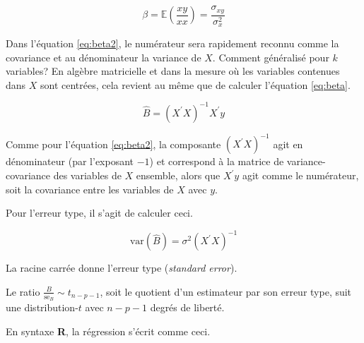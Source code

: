 \documentclass[
]{book}
\newcommand{\EX}{\mathbb{E}}
\begin{document}
\begin{equation}
\beta = \EX(\frac{xy}{xx}) = \frac{\sigma_{xy}}{\sigma^2_x}
\label{eq:beta2}
\end{equation}

Dans l'équation \eqref{eq:beta2}, le numérateur sera rapidement reconnu comme la covariance et au dénominateur la variance de \(X\). Comment généralisé pour \(k\) variables? En algèbre matricielle et dans la mesure où les variables contenues dans \(X\) sont centrées, cela revient au même que de calculer l'équation \eqref{eq:beta}.

\begin{equation}
\hat{B} = (X^{\prime} X)^{-1} X^{\prime} y
\label{eq:beta}
\end{equation}

Comme pour l'équation \eqref{eq:beta2}, la composante \((X^{\prime} X)^{-1}\) agit en dénominateur (par l'exposant \(-1\)) et correspond à la matrice de variance-covariance des variables de \(X\) ensemble, alors que \(X^{\prime} y\) agit comme le numérateur, soit la covariance entre les variables de \(X\) avec \(y\).

Pour l'erreur type, il s'agit de calculer ceci.

\begin{equation}
\text{var}(\hat{B}) = \sigma^2 \left(X^{\prime}X\right)^{-1}
\end{equation}

La racine carrée donne l'erreur type (\emph{standard error}).

Le ratio \(\frac{B}{\text{se}_B} \sim t_{n-p-1}\), soit le quotient d'un estimateur par son erreur type, suit une distribution-\(t\) avec \(n-p-1\) degrés de liberté.

En syntaxe \textbf{R}, la régression s'écrit comme ceci.
\end{document}
